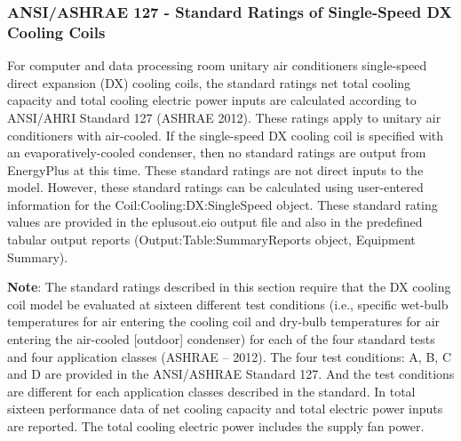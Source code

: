 \subsubsection{ANSI/ASHRAE 127 - Standard Ratings of Single-Speed DX Cooling Coils}\label{ansiashrae-127---standard-ratings-of-single-speed-dx-cooling-coils}

For computer and data processing room unitary air conditioners single-speed direct expansion (DX) cooling coils, the standard ratings net total cooling capacity and total cooling electric power inputs are calculated according to ANSI/AHRI Standard 127 (ASHRAE 2012). These ratings apply to unitary air conditioners with air-cooled. If the single-speed DX cooling coil is specified with an evaporatively-cooled condenser, then no standard ratings are output from EnergyPlus at this time. These standard ratings are not direct inputs to the model. However, these standard ratings can be calculated using user-entered information for the Coil:Cooling:DX:SingleSpeed object. These standard rating values are provided in the eplusout.eio output file and also in the predefined tabular output reports (Output:Table:SummaryReports object, Equipment Summary).

\textbf{Note}: The standard ratings described in this section require that the DX cooling coil model be evaluated at sixteen different test conditions (i.e., specific wet-bulb temperatures for air entering the cooling coil and dry-bulb temperatures for air entering the air-cooled {[}outdoor{]} condenser) for each of the four standard tests and four application classes (ASHRAE -- 2012). The four test conditions: A, B, C and D are provided in the ANSI/ASHRAE Standard 127. And the test conditions are different for each application classes described in the standard. In total sixteen performance data of net cooling capacity and total electric power inputs are reported. The total cooling electric power includes the supply fan power.

